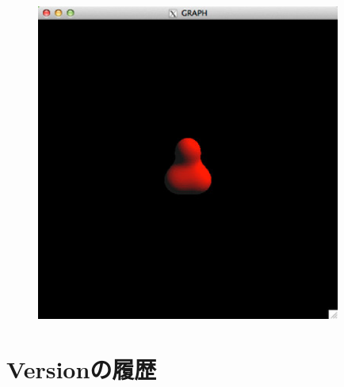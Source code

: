 \documentclass[platex,a4paper,12pt]{jsarticle}%
\begin{document}
\begin{figure}[htb]
	\includegraphics[width=100mm]{./Figures/eps/Canvas_g_isosurface.eps}
\end{figure}


\newpage
\section{Versionの履歴}
\end{document}

